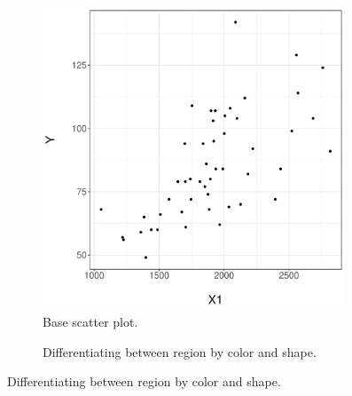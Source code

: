 \documentclass[12pt,letterpaper]{article}
\begin{document}
\vspace{.25cm}
  
  
  
  
\begin{figure}[h!]
	\centering
		\caption{\footnotesize Relationship between $X_1$ and $Y$.}
		\label{fig:plot3d}
	\begin{subfigure}[t]{0.5\textwidth}
		\centering
				\caption{\footnotesize Base scatter plot.}
		\includegraphics[width=0.99\textwidth]{plot_3d1.pdf}
	\end{subfigure}%
	\begin{subfigure}[t]{0.5\textwidth}
		\centering
			\caption{\footnotesize Differentiating between region by color and shape.}

\end{subfigure}
\end{figure}
\end{document}
